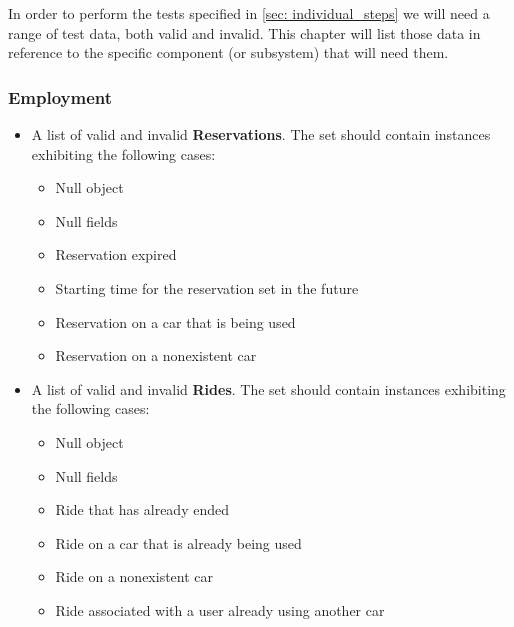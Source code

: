 	In order to perform the tests specified in \autoref{sec: individual_steps} we will need a range of test data, both valid and invalid. This chapter will list those data in reference to the specific component (or subsystem) that will need them. %
	
	
	
		\subsubsection{Employment}
		
		\begin{itemize}
			\item A list of valid and invalid \textbf{Reservations}. The set should contain instances exhibiting the following cases:
				\begin{itemize}
					\item Null object
					\item Null fields
					\item Reservation expired
					\item Starting time for the reservation set in the future
					\item Reservation on a car that is being used
					\item Reservation on a nonexistent car
				\end{itemize}
		\end{itemize}
		
		\begin{itemize}
			\item A list of valid and invalid \textbf{Rides}. The set should contain instances exhibiting the following cases:
				\begin{itemize}
					\item Null object
					\item Null fields
					\item Ride that has already ended
					\item Ride on a car that is already being used
					\item Ride on a nonexistent car
					\item Ride associated with a user already using another car
				\end{itemize}
		\end{itemize}
		
